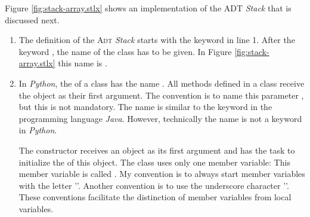 Figure \ref{fig:stack-array.stlx} shows an implementation of the ADT \textsl{Stack} that is 
discussed next.
\begin{enumerate}
\item The definition of the \textsc{Adt} \textsl{Stack} starts with the keyword 
      in line 1.
      After the keyword , the name of the class has to be given.  In Figure
      \ref{fig:stack-array.stlx} this name is .
\item In \textsl{Python}, the  of a class has the name .
      All methods defined in a class receive the object as their first argument.
      The convention is to name this parameter , but this is not mandatory.
      The name  is similar to the keyword  in the programming language
      \textsl{Java}.  However, technically the name  is not a keyword in \textsl{Python}.
      
      The constructor receives an  object as its first argument and has the task
      to initialize the  of this object.  The class  uses only one member variable:
      This member variable is called .  My convention is to always start member
      variables with the letter ''.  Another convention is to use the underscore character
      '\mytt{\_}'.  These conventions facilitate the distinction of member variables from local variables.


\end{enumerate}
